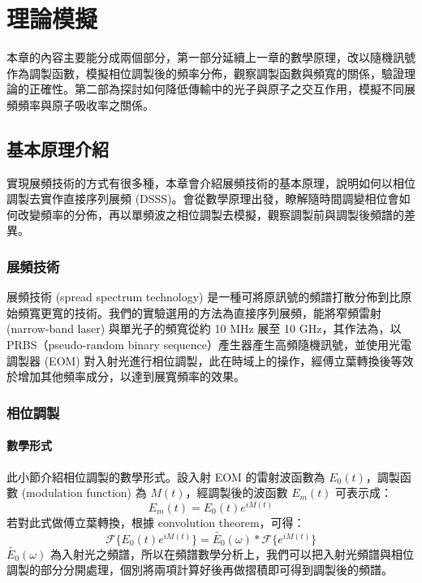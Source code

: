 \documentclass[class=NCU_thesis, crop=false]{standalone}
\begin{document}
\chapter{理論模擬}

本章的內容主要能分成兩個部分，第一部分延續上一章的數學原理，改以隨機訊號作為調製函數，模擬相位調製後的頻率分佈，觀察調製函數與頻寬的關係，驗證理論的正確性。第二部為探討如何降低傳輸中的光子與原子之交互作用，模擬不同展頻頻率與原子吸收率之關係。


\section{基本原理介紹}
實現展頻技術的方式有很多種，本章會介紹展頻技術的基本原理，說明如何以相位調製去實作直接序列展頻 (DSSS)。會從數學原理出發，瞭解隨時間調變相位會如何改變頻率的分佈，再以單頻波之相位調製去模擬，觀察調製前與調製後頻譜的差異。

\subsection{展頻技術}

展頻技術 (spread spectrum technology) 是一種可將原訊號的頻譜打散分佈到比原始頻寬更寬的技術。我們的實驗選用的方法為直接序列展頻，能將窄頻雷射 (narrow-band laser) 與單光子的頻寬從約 10 MHz 展至 10 GHz，其作法為，以 PRBS（pseudo-random binary sequence）產生器產生高頻隨機訊號，並使用光電調製器 (EOM) 對入射光進行相位調製，此在時域上的操作，經傅立葉轉換後等效於增加其他頻率成分，以達到展寬頻率的效果。
\subsection{相位調製}

\subsubsection{數學形式}
此小節介紹相位調製的數學形式。設入射 EOM 的雷射波函數為 $E_{0}(t)$，調製函數 (modulation function) 為 $M(t)$，經調製後的波函數 $E_{m}(t)$ 可表示成：
\begin{equation}
    E_{m}(t)=E_{0}(t)e^{iM(t)}
\end{equation}
若對此式做傅立葉轉換，根據 convolution theorem，可得：
\begin{equation}
\label{eq:modulation_function}
    \mathscr{F}\{E_{0}(t)e^{iM(t)}\}=\tilde{E_{0}}(\omega)*\mathscr{F}\{{e^{iM(t)}}\}
\end{equation}
$\tilde{E_{0}}(\omega)$ 為入射光之頻譜，所以在頻譜數學分析上，我們可以把入射光頻譜與相位調製的部分分開處理，個別將兩項計算好後再做摺積即可得到調製後的頻譜。
\end{document}
